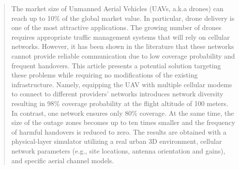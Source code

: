 \documentclass[conference,twocolumn,a4paper]{IEEEtran}
\newcommand{\ac}[1]{{\color{teal}[Achiel: #1]}}
\begin{document}
\begin{abstract}
The market size of Unmanned Aerial Vehicles (UAVs, a.k.a drones) can reach up to 10\% of the global market value. In particular, drone delivery is one of the most attractive applications. The growing number of drones requires appropriate traffic management systems that will rely on cellular networks. However, it has been shown in the literature that these networks cannot provide reliable communication due to low coverage probability and frequent handovers. This article presents a potential solution targeting these problems while requiring no modifications of the existing infrastructure. Namely, equipping the UAV with multiple cellular modems to connect to different providers' networks introduces network diversity resulting in 98\% coverage probability at the flight altitude of 100 meters. In contrast, one network ensures only 80\% coverage. At the same time, the size of the outage zones becomes up to ten times smaller and the frequency of harmful handovers is reduced to zero. The results are obtained with a physical-layer simulator utilizing a real urban 3D environment, cellular network parameters (e.g., site locations, antenna orientation and gains), and specific aerial channel models.
\end{abstract}
\end{document}
